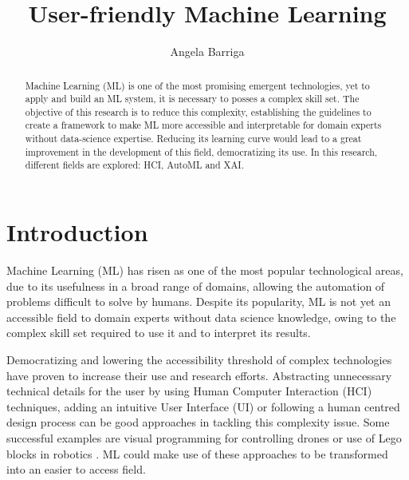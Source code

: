 \documentclass[runningheads]{llncs}
\begin{document}
%
\title{User-friendly Machine Learning}
%
%
\author{Angela Barriga}
%
%
%
\maketitle              %
%
\begin{abstract}
Machine Learning (ML) is one of the most promising emergent technologies, yet to apply and build an ML system, it is necessary to posses a complex skill set. 
The objective of this research is to reduce this complexity, establishing the guidelines to create a framework to make ML more accessible and interpretable for domain experts without data-science expertise. 
Reducing its learning curve would lead to a great improvement in the development of this field, democratizing its use. In this research, different fields are explored: HCI, AutoML and XAI.

\end{abstract}
%
%
%
\section{Introduction}\label{intro}

Machine Learning (ML) has risen as one of the most popular technological areas, due to its usefulness in a broad range of domains, allowing the automation of problems difficult to solve by humans. 
Despite its popularity, ML is not yet an accessible field to domain experts without data science knowledge, owing to the complex skill set required to use it and to interpret its results.  

Democratizing and lowering the accessibility threshold of complex technologies have proven to increase their use and research efforts. 
Abstracting unnecessary technical details for the user by using Human Computer Interaction (HCI) techniques, adding an intuitive User Interface (UI) or following a human centred design process can be good approaches in tackling this complexity issue. 
Some successful examples are visual programming for controlling drones \cite{1} or use of Lego blocks in robotics \cite{2}. 
ML could make use of these approaches to be transformed into an easier to access field. 
\end{document}
